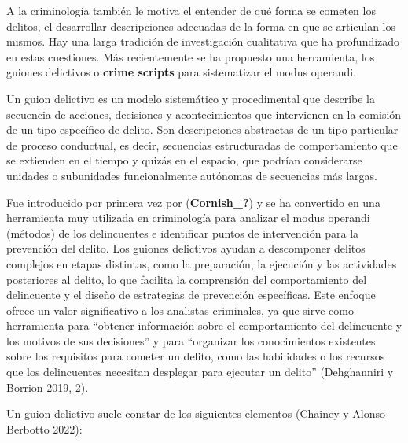 \documentclass[
  spanish,
  letterpaper,
  DIV=11,
  numbers=noendperiod]{scrreprt}
\begin{document}
A la criminología también le motiva el entender de qué forma se cometen
los delitos, el desarrollar descripciones adecuadas de la forma en que
se articulan los mismos. Hay una larga tradición de investigación
cualitativa que ha profundizado en estas cuestiones. Más recientemente
se ha propuesto una herramienta, los guiones delictivos o \textbf{crime
scripts} para sistematizar el modus operandi.

Un guion delictivo es un modelo sistemático y procedimental que describe
la secuencia de acciones, decisiones y acontecimientos que intervienen
en la comisión de un tipo específico de delito. Son descripciones
abstractas de un tipo particular de proceso conductual, es decir,
secuencias estructuradas de comportamiento que se extienden en el tiempo
y quizás en el espacio, que podrían considerarse unidades o subunidades
funcionalmente autónomas de secuencias más largas.

Fue introducido por primera vez por (\textbf{Cornish\_?}) y se ha
convertido en una herramienta muy utilizada en criminología para
analizar el modus operandi (métodos) de los delincuentes e identificar
puntos de intervención para la prevención del delito. Los guiones
delictivos ayudan a descomponer delitos complejos en etapas distintas,
como la preparación, la ejecución y las actividades posteriores al
delito, lo que facilita la comprensión del comportamiento del
delincuente y el diseño de estrategias de prevención específicas. Este
enfoque ofrece un valor significativo a los analistas criminales, ya que
sirve como herramienta para ``obtener información sobre el
comportamiento del delincuente y los motivos de sus decisiones'' y para
``organizar los conocimientos existentes sobre los requisitos para
cometer un delito, como las habilidades o los recursos que los
delincuentes necesitan desplegar para ejecutar un delito'' (Dehghanniri
y Borrion 2019, 2).

Un guion delictivo suele constar de los siguientes elementos (Chainey y
Alonso-Berbotto 2022):
\end{document}

